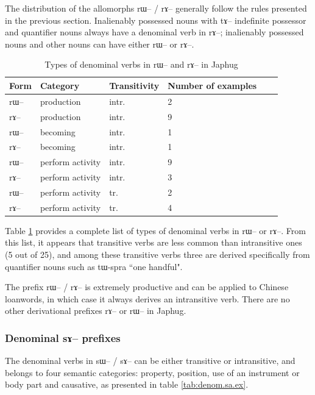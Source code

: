 \documentclass[oldfontcommands,oneside,a4paper,11pt]{article}
\newcommand{\ipa}[1]{{\phon \mbox{#1}}} %
\begin{document}
The distribution of the allomorphs \ipa{rɯ}-- / \ipa{rɤ}-- generally follow the rules presented in the previous section. Inalienably possessed nouns with \ipa{tɤ}-- indefinite possessor and  quantifier nouns always have a denominal verb in \ipa{rɤ}--; inalienably possessed nouns and other nouns can have either \ipa{rɯ}-- or \ipa{rɤ}--.










  \begin{table}[H] \label{tab:denom.ra.list}
 \caption{Types of denominal verbs in \ipa{rɯ}-- and \ipa{rɤ}-- in Japhug}
\begin{tabular}{llllll}
\toprule
Form & Category &Transitivity&  Number of examples  \\
\midrule
\ipa{rɯ}--& production & intr. & 2\\
\ipa{rɤ}--& production & intr. & 9\\
\ipa{rɯ}--& becoming & intr. & 1\\
\ipa{rɤ}--& becoming & intr. & 1\\
\ipa{rɯ}--& perform activity & intr. &9\\
\ipa{rɤ}--& perform activity & intr. & 3\\
\ipa{rɯ}--& perform activity & tr. &2\\
\ipa{rɤ}--& perform activity & tr. & 4\\
\bottomrule
\end{tabular}
\end{table} 
Table \ref{tab:denom.ra.list} provides a complete list of types of denominal verbs in \ipa{rɯ}-- or \ipa{rɤ}--. From this list, it appears that transitive verbs are less common than intransitive ones (5 out of 25), and among these transitive verbs three are derived specifically from quantifier nouns such as \ipa{tɯ-spra} ``one handful".

The prefix \ipa{rɯ}-- / \ipa{rɤ}-- is extremely productive and can be applied to Chinese loanwords, in which case it always derives an intransitive verb. There are no other derivational prefixes \ipa{rɤ}-- or \ipa{rɯ}-- in Japhug.

\subsubsection{Denominal \ipa{sɤ}-- prefixes} \label{subsubsec:sa}
The denominal verbs in \ipa{sɯ}-- / \ipa{sɤ}-- can be either transitive or intransitive, and belongs to four semantic categories: property, position, use of an instrument or body part and causative, as presented in table \ref{tab:denom.sa.ex}.
\end{document}
